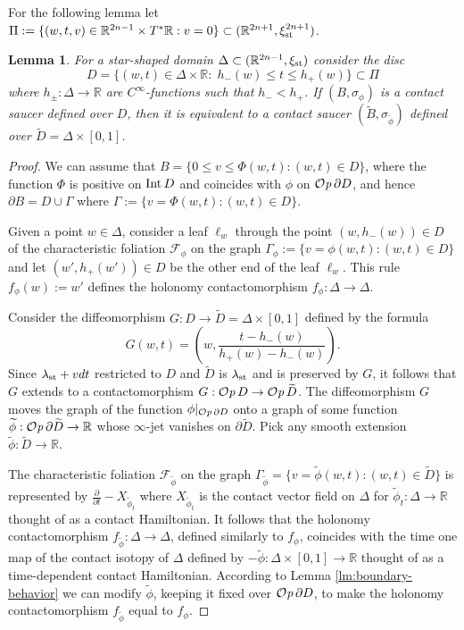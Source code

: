 \documentclass[12pt]{paper}
\theoremstyle{plain}
\newtheorem{lemma}[theorem]{Lemma}
\theoremstyle{definition}
\newcommand{\wt}{\widetilde}
\newcommand{\p}{\partial}
\newcommand{\R}{{\mathbb{R}}}
\newcommand{\st}{{\rm st}}
\newcommand{\Int}{{\rm Int\,}} %
\newcommand{\FF}{\mathcal{F}}
\def\Op{{\mathcal O}{\it p}\,}
\numberwithin{figure}{section}
\begin{document}
 For the following lemma let $\Pi := \{(w,t,v) \in \R^{2n-1} \times T^*\R: v = 0\} \subset (\R^{2n+1}, \xi_\st^{2n+1})$.
 
\begin{lemma}\label{lm:two-saucers}
For a star-shaped domain $\Delta\subset
(\R^{2n-1}, \xi_\st)$ consider the disc
$$D=\{(w,t)\in \Delta \times \R: \; h_-(w)\leq t \leq h_+(w)\} \subset \Pi$$
where $h_\pm:\Delta\to\R$ are $C^{\infty}$-functions such that $h_-<h_+$.
If $(B,\sigma_\phi)$ is a contact saucer defined over $D$, then it is equivalent to a contact 
saucer $ (\wt B,\sigma_{\wt\phi})$ defined over
$\wt D=\Delta\times[0,1]$.
\end{lemma}

 \begin{proof}
 We can assume that 
 $B=\{0\leq v\leq\Phi(w,t): (w,t)\in D\}$,
   where the function  $\Phi $ is positive on $\Int D$  and coincides with $\phi$  
 on $\Op\p D$, and hence $\p B=D\cup\Gamma$  where $\Gamma:=\{v=\Phi(w,t): (w,t)\in D\}$. 
 
Given a point $w\in\Delta$, consider a leaf $\ell_w$ through the point $(w,h_-(w)) \in D$
of the characteristic foliation $\FF_\phi$ on the graph $\Gamma_\phi:=\{v=\phi(w,t): (w,t)\in D\}$
and let $(w', h_+(w')) \in D$ be the other end of the leaf $\ell_w$.   This rule $f_\phi(w):=w'$
defines the holonomy contactomorphism $ f_\phi:\Delta \to\Delta$. 

 Consider the  diffeomorphism $G:D\to \wt D=\Delta\times[0,1]$
defined by the formula
$$G(w,t)=\left(w,\frac{t- h_-(w)}{h_+(w)-h_-(w)}\right).$$
Since $\lambda_{\st} + vdt$ restricted to $D$ and $\wt{D}$ is $\lambda_{\st}$ and is preserved by $G$,
it follows that $G$ extends to a contactomorphism $G:\Op D \to \Op\wt D$.
The diffeomorphism $G$ moves the  graph of the function $\phi|_{\Op\p D}$ 
onto a graph of some function $  \wt \phi:\Op\p\wt D\to\R$ whose $\infty$-jet vanishes on $\p\wt D$. Pick any smooth extension $\wt \phi: \wt{D} \to \R$. 

The characteristic foliation $\FF_{\wt\phi}$ on the graph $\Gamma_{\wt\phi} = \{v=\wt\phi(w,t): (w,t)\in \wt{D}\}$ 
is represented by $\tfrac{\partial}{\partial t} - X_{\wt\phi_t}$ where $X_{\wt\phi_t}$ is the contact vector field on $\Delta$ for 
$\wt\phi_t: \Delta \to \R$ thought of as a contact Hamiltonian.   It follows that
the holonomy contactomorphism $f_{\wt\phi}:\Delta\to\Delta$, defined similarly to $f_\phi$, coincides
with the time one map of the contact isotopy of $\Delta$ defined by $-\wt\phi:\Delta\times[0,1]\to\R$
thought of as a time-dependent contact Hamiltonian.
According  to Lemma \ref{lm:boundary-behavior} we can modify $\wt\phi$, keeping it fixed over $\Op\p D$, to make the holonomy contactomorphism $f_{\wt\phi}$  equal to $f_\phi$.  %


\end{proof}
\end{document}
